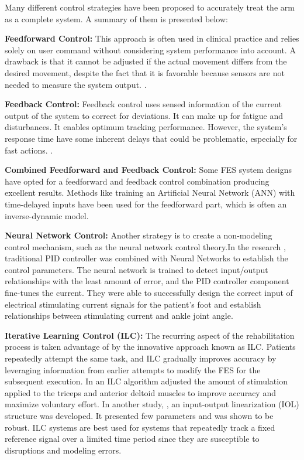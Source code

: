 Many different control strategies have been proposed to accurately treat the arm as a complete system. A summary of them is presented below:

\textbf{Feedforward Control:} This approach is often used in clinical practice and relies solely on user command without considering system performance into account. A drawback is that it cannot be adjusted if the actual movement differs from the desired movement, despite the fact that it is favorable because sensors are not needed to measure the system output.  \cite{CFF}.

\textbf{Feedback Control:} Feedback control uses sensed information of the current output of the system to correct for deviations. It can make up for fatigue and disturbances. It enables optimum tracking performance. However, the system's response time have some inherent delays that could be problematic, especially for fast actions. \cite{CFF}.

\textbf{Combined Feedforward and Feedback Control:} Some FES system designs have opted for a feedforward and feedback control combination producing excellent results. Methods like training an Artificial Neural Network (ANN) with time-delayed inputs have been used for the feedforward part, which is often an inverse-dynamic model.

\textbf{Neural Network Control:} Another strategy is to create a non-modeling control mechanism, such as the neural network control theory.In the research \cite{NNPID}, traditional PID controller was combined with Neural Networks to establish the control parameters. The neural network is trained to detect input/output relationships with the least amount of error, and the PID controller component fine-tunes the current. They were able to successfully design the correct input of electrical stimulating current signals for the patient's foot and establish relationships between stimulating current and ankle joint angle. 

\textbf{Iterative Learning Control (ILC):} The recurring aspect of the rehabilitation process is taken advantage of by the innovative approach known as ILC. Patients repeatedly attempt the same task, and ILC gradually improves accuracy by leveraging information from earlier attempts to modify the FES for the subsequent execution. In \cite{FESILC} an ILC algorithm adjusted the amount of stimulation applied to the triceps and anterior deltoid muscles to improve accuracy and maximize voluntary effort. In another study, \cite{IOL}, an input-output linearization (IOL) structure was developed. It presented few parameters and was shown to be robust.  ILC systems are best used for systems that repeatedly track a fixed reference signal over a limited time period since they are susceptible to disruptions and modeling errors.


